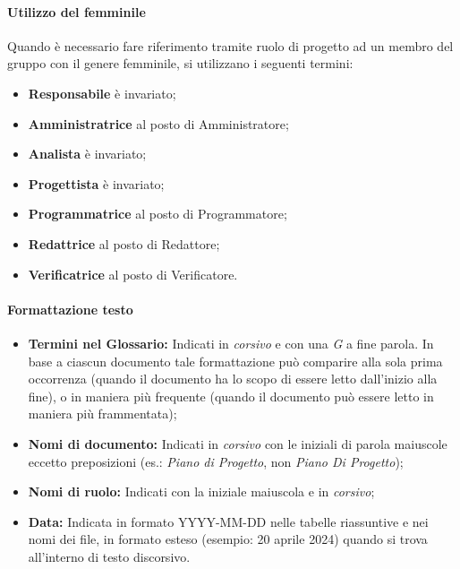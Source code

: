 \paragraph{Utilizzo del femminile}
Quando è necessario fare riferimento tramite ruolo di progetto ad un membro del gruppo con il genere femminile, si utilizzano i seguenti termini:
\begin{itemize}
  \item \textbf{Responsabile} è invariato;
  \item \textbf{Amministratrice} al posto di Amministratore;
  \item \textbf{Analista} è invariato;
  \item \textbf{Progettista} è invariato;
  \item \textbf{Programmatrice} al posto di Programmatore;
  \item \textbf{Redattrice} al posto di Redattore;
  \item \textbf{Verificatrice} al posto di Verificatore.
\end{itemize}

\paragraph{Formattazione testo}
\begin{itemize}
  \item \textbf{Termini nel Glossario:} Indicati in \textit{corsivo} e con una \textit{\small{G}} a fine parola. In base a ciascun documento tale formattazione può comparire alla sola prima occorrenza (quando il documento ha lo scopo di essere letto dall'inizio alla fine), o in maniera più frequente (quando il documento può essere letto in maniera più frammentata);
  \item \textbf{Nomi di documento:} Indicati in \textit{corsivo} con le iniziali di parola maiuscole eccetto preposizioni (es.: \textit{Piano di Progetto}, non \textit{Piano Di Progetto});
  \item \textbf{Nomi di ruolo:} Indicati con la iniziale maiuscola e in \textit{corsivo};
  \item \textbf{Data:} Indicata in formato YYYY-MM-DD nelle tabelle riassuntive e nei nomi dei file, in formato esteso (esempio: 20 aprile 2024) quando si trova all'interno di testo discorsivo.
\end{itemize}

